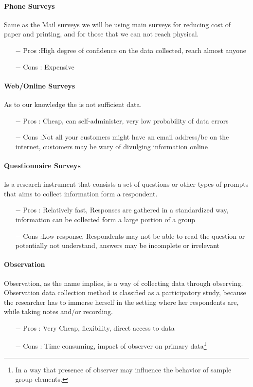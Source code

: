 \paragraph{Phone Surveys}
Same as the Mail surveys we will be using main surveys for reducing cost of paper and printing, and for those that we can not reach physical.
\begin{itemize}
    \item[$-$] Pros :High degree of confidence on the data collected, reach almost anyone
    \item[$-$] Cons : Expensive
\end{itemize}

\paragraph{Web/Online Surveys}
As to our knowledge the is not sufficient data.
\begin{itemize}
    \item[$-$] Pros : Cheap, can self-administer, very low probability of data errors
    \item[$-$] Cons :Not all your customers might have an email address/be on the internet, customers may be wary of divulging information online
\end{itemize}

\paragraph{Questionnaire Surveys}
Is a research instrument that consists a set of questions or other types of prompts that aims to collect information form a respondent.
\begin{itemize}
    \item[$-$] Pros : Relatively fast, Responses are gathered in a standardized way,\\information can be collected form a large portion of a group
    \item[$-$] Cons :Low response, Respondents may not be able to read the question or potentially not understand, answers may be incomplete or irrelevant
\end{itemize}

\paragraph{Observation}
Observation, as the name implies, is a way of collecting data through observing. Observation data collection method is classified as a participatory study, because the researcher has to immerse herself in the setting where her respondents are, while taking notes and/or recording.
\begin{itemize}
    \item[$-$] Pros : Very Cheap, flexibility, direct access to data
    \item[$-$] Cons : Time consuming, impact of observer on primary data\footnote{In a way that presence of observer may influence the behavior of sample group elements.}
\end{itemize}

